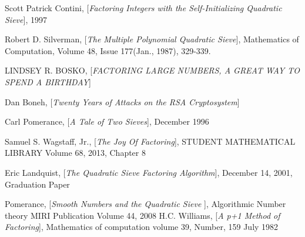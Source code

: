 \documentclass[12pt]{article} %
\begin{document}
\begin{thebibliography}{99}

 Scott Patrick Contini, [\textit{Factoring Integers with the Self-Initializing Quadratic Sieve}], 1997

 Robert D. Silverman, [\textit{The Multiple Polynomial Quadratic Sieve}], Mathematics of Computation, Volume 48, Issue 177(Jan., 1987), 329-339.

 LINDSEY R. BOSKO, [\textit{FACTORING LARGE NUMBERS, A GREAT WAY TO SPEND A BIRTHDAY}]

 Dan Boneh, [\textit{Twenty Years of Attacks on the RSA Cryptosystem}]

 Carl Pomerance, [\textit{A Tale of Two Sieves}], December 1996

 Samuel S. Wagstaff, Jr., [\textit{The Joy Of Factoring}], STUDENT MATHEMATICAL LIBRARY Volume 68, 2013, Chapter 8

 Eric Landquist, [\textit{The Quadratic Sieve Factoring Algorithm}], December 14, 2001, Graduation Paper

 Pomerance, [\textit{Smooth Numbers and the Quadratic Sieve }], Algorithmic Number theory MIRI Publication Volume 44, 2008
 H.C. Williams, [\textit{A p+1 Method of Factoring}], Mathematics of computation volume 39, Number, 159 July 1982

\end{thebibliography}

 
\end{document}
